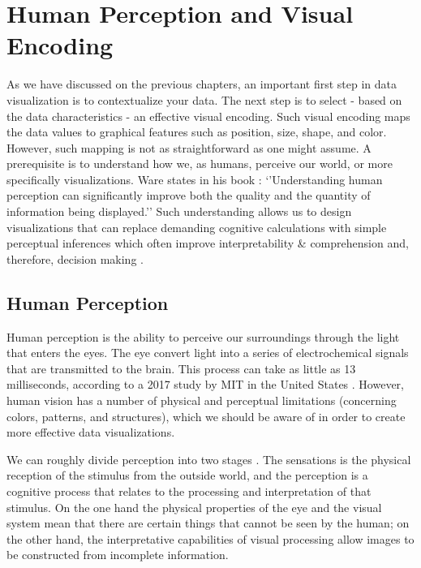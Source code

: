 \documentclass[
]{book}
\begin{document}
\hypertarget{human-perception-and-visual-encoding}{%
\chapter{Human Perception and Visual Encoding}\label{human-perception-and-visual-encoding}}

As we have discussed on the previous chapters, an important first step in data visualization is to contextualize your data. The next step is to select - based on the data characteristics - an effective visual encoding. Such visual encoding maps the data values to graphical features such as position, size, shape, and color. However, such mapping is not as straightforward as one might assume. A prerequisite is to understand how we, as humans, perceive our world, or more specifically visualizations. Ware states in his book \citep{ware2019information}: `'Understanding human perception can significantly improve both the quality and the quantity of information being displayed.'' Such understanding allows us to design visualizations that can replace demanding cognitive calculations with simple perceptual inferences which often improve interpretability \& comprehension and, therefore, decision making \citep{Heer_Bostock_Ogievetsky_2010}.

\hypertarget{human-perception}{%
\section{Human Perception}\label{human-perception}}

Human perception is the ability to perceive our surroundings through the light that enters the eyes. The eye convert light into a series of electrochemical signals that are transmitted to the brain. This process can take as little as 13 milliseconds, according to a 2017 study by MIT in the United States \citep{munzner2014visualization}. However, human vision has a number of physical and perceptual limitations (concerning colors, patterns, and structures), which we should be aware of in order to create more effective data visualizations.

We can roughly divide perception into two stages \citep{Few2004showmenumbers}. The sensations is the physical reception of the stimulus from the outside world, and the perception is a cognitive process that relates to the processing and interpretation of that stimulus. On the one hand the physical properties of the eye and the visual system mean that there are certain things that cannot be seen by the human; on the other hand, the interpretative capabilities of visual processing allow images to be constructed from incomplete information.
\end{document}
